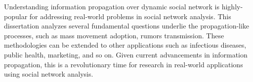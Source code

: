 Understanding information propagation over dynamic social network is highly-popular for addressing real-world problems in social network analysis. This dissertation analyzes several fundamental questions underlie the propagation-like processes, such as mass movement adoption, rumors transmission. These methodologies can be extended to other applications such as infectious diseases, public health, marketing, and so on. Given current advancements in information propagation, this is a revolutionary time for research in real-world applications using social network analysis. 





